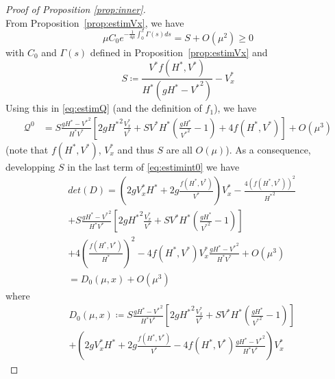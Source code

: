 \documentclass[11pt]{article}
\begin{document}
\begin{proof}[Proof of Proposition \ref{prop:inner}]
\begin{equation}
\end{equation}
From Proposition~\ref{prop:estimVx}, we have
\begin{equation}
  \mu C_{0} e^{-\frac{1}{4\mu}\int_{0}^{x}{\Gamma(s)}ds} = S +O(\mu^{2}) \geq 0
\end{equation}
with $C_0$ and ${\Gamma(s)}$ defined in Proposition~\ref{prop:estimVx} and
\begin{equation}
    S \coloneqq \frac{V^{*}f(H^{*},V^{*})}{H^{*}(gH^{*}-{V^{*}}^{2})} - V_{x}^{*}
\end{equation}
Using this in \eqref{eq:estimQ} (and the definition of $f_{1}$), we have
\begin{equation}
\label{eq:estimint0}
\begin{split}
    \mathcal{Q}^{0} &= S\frac{gH^{*}-{V^{*}}^{2}}{H^{*}V^{*}}
    \left[
    2g{H^{*}}^{2} \frac{V_{x}^{*}}{V^{*}}+ SV^{*}H^{*}\left(\frac{gH^{*}}{{V^{*}}^{2}}-1\right)+4 f(H^{*},V^{*})
    \right]+O(\mu^{3})
\end{split}
\end{equation}
{(note that $f(H^*,V^*)$, $V_x^*$ and thus $S$ are all $O(\mu)$)}. As a consequence, developping $S$ in the last term of \eqref{eq:estimint0} we have
\begin{equation}
\label{eq:defD0}
    \begin{split}
           &det(D) = \left(2g{V_{x}^{*}}H^{*}+2g\frac{f(H^{*},V^{*})}{V^{*}}\right)V_{x}^{*}-\frac{4(f(H^{*},V^{*}))^{2}}{{H^{*}}^{2}}\\
        &+S\frac{gH^{*}-{V^{*}}^{2}}{H^{*}V^{*}}
    \left[
    2g{H^{*}}^{2} \frac{V_{x}^{*}}{V^{*}}+ SV^{*}H^{*}\left(\frac{gH^{*}}{{V^{*}}^{2}}-1\right)\right]\\
    &+4 \left(\frac{f(H^{*},V^{*})}{H^{*}}\right)^{2}-4f(H^{*},V^{*}) V_{x}^{*}\frac{gH^{*}-{V^{*}}^{2}}{H^{*}V^{*}}
    +O(\mu^3)\\
    &= D_{0}(\mu,x)+O(\mu^3)
    \end{split}
\end{equation}
where
\small
\begin{equation}
    \begin{split}
    &D_0(\mu, x) \coloneqq S\frac{gH^{*}-{V^{*}}^{2}}{H^{*}V^{*}}
    \left[
    2g{H^{*}}^{2} \frac{V_{x}^{*}}{V^{*}}+ SV^{*}H^{*}\left(\frac{gH^{*}}{{V^{*}}^{2}}-1\right)\right] \\
    &+\left(2g{V_{x}^{*}}H^{*}+2g\frac{f(H^{*},V^{*})}{V^{*}}
    -4f(H^{*},V^{*}) \frac{gH^{*}-{V^{*}}^{2}}{H^{*}V^{*}}
    \right)V_{x}^{*}
    \end{split}

\end{equation}
\end{proof}
\end{document}
